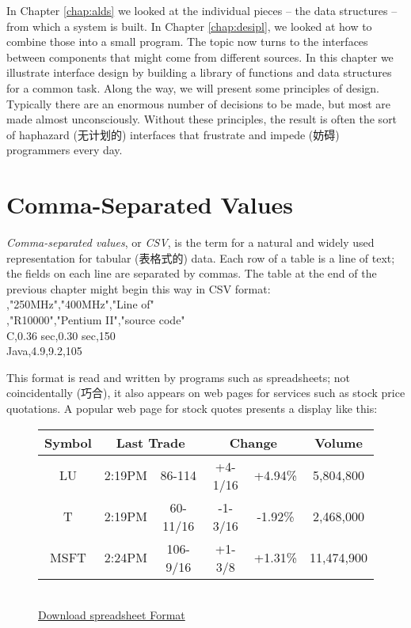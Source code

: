 In Chapter \ref{chap:alds} we looked at the individual pieces -- the data
structures -- from which a system is built. In Chapter \ref{chap:desipl},
we looked at how to combine those into a small program. The topic now turns
to the interfaces between components that might come from different
sources. In this chapter we illustrate interface design by building a
library of functions and data structures for a common task. Along the way,
we will present some principles of design. Typically there are an enormous
number of decisions to be made, but most are made almost unconsciously.
Without these principles, the result is often the sort of haphazard
(无计划的) interfaces that frustrate and impede (妨碍) programmers every
day.

\section{Comma-Separated Values}
\label{sec:comma_separated_values}

\emph{Comma-separated values}, or \emph{CSV}, is the term for a natural and
widely used representation for tabular (表格式的) data. Each row of a table
is a line of text; the fields on each line are separated by commas. The
table at the end of the previous chapter might begin this way in CSV
format: \\
\indent\indent ,"250MHz","400MHz","Line of" \\
\indent\indent ,"R10000","Pentium II","source code" \\
\indent\indent C,0.36 sec,0.30 sec,150 \\
\indent\indent Java,4.9,9.2,105

This format is read and written by programs such as spreadsheets; not
coincidentally (巧合), it also appears on web pages for services such as
stock price quotations. A popular web page for stock quotes presents a
display like this:
\begin{figure}[h]
    \centering
\begin{tabular}{|c|c|c|c|c|c|}
    \hline
    \textbf{Symbol}  & \multicolumn{2}{|c|}{\textbf{Last Trade}} &
    \multicolumn{2}{|c|}{\textbf{Change}} & \textbf{Volume}   \\
    \hline
    LU  & 2:19PM    & 86-114    & +4-1/16   & +4.94\%   & 5,804,800 \\
    \hline
    T   & 2:19PM    & 60-11/16  & -1-3/16   & -1.92\%   & 2,468,000 \\
    \hline
    MSFT& 2:24PM    & 106-9/16  & +1-3/8    & +1.31\%   & 11,474,900\\
    \hline
\end{tabular}
\\
\vspace{1em}
{\centering\underline{Download spreadsheet Format}}
\end{figure}


